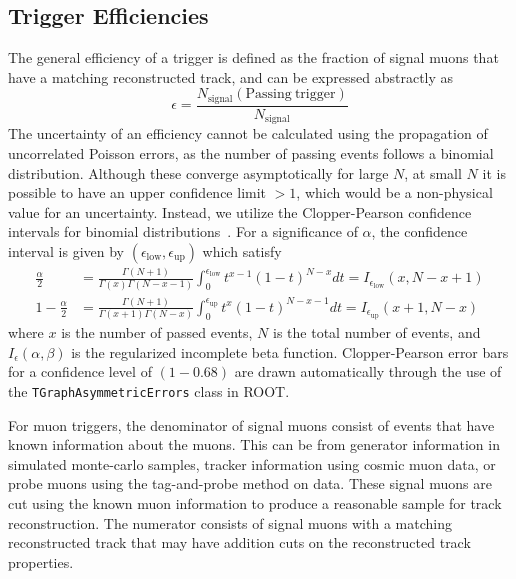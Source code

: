 \subsection{Trigger Efficiencies} \label{sec:kmtf_eff}
The general efficiency of a trigger is defined as the fraction of signal muons that have a matching reconstructed track, and can be expressed abstractly as
\begin{equation}\label{eq:eff}
	\epsilon=\frac{N_\mathrm{signal}(\mathrm{Passing\ trigger})}{N_\mathrm{signal}}	
\end{equation}
The uncertainty of an efficiency cannot be calculated using the propagation of uncorrelated Poisson errors, as the number of passing events follows a binomial distribution. Although these converge asymptotically for large $N$, at small $N$ it is possible to have an upper confidence limit $>1$, which would be a non-physical value for an uncertainty. Instead, we utilize the Clopper-Pearson confidence intervals for binomial distributions~\cite{clopperpearson}. For a significance of $\alpha$, the confidence interval is given by $(\epsilon_\text{low}, \epsilon_\text{up})$ which satisfy
\begin{align}
		\frac{\alpha}{2}&=\frac{\Gamma(N+1)}{\Gamma(x)\Gamma(N-x-1)}\int_{0}^{\epsilon_\text{low}}t^{x-1}(1-t)^{N-x}dt=I_{\epsilon_\text{low}}(x,N-x+1)\\
		1-\frac{\alpha}{2}&=\frac{\Gamma(N+1)}{\Gamma(x+1)\Gamma(N-x)}\int_{0}^{\epsilon_\text{up}}t^x(1-t)^{N-x-1}dt=I_{\epsilon_\text{up}}(x+1,N-x)
\end{align}
where $x$ is the number of passed events, $N$ is the total number of events, and $I_\epsilon(\alpha,\beta)$ is the regularized incomplete beta function. Clopper-Pearson error bars for a confidence level of $(1-0.68)$ are drawn automatically through the use of the \texttt{TGraphAsymmetricErrors} class in ROOT.

For muon triggers, the denominator of signal muons consist of events that have known information about the muons. This can be from generator information in simulated monte-carlo samples, tracker information using cosmic muon data, or probe muons using the tag-and-probe method on data. These signal muons are cut using the known muon information to produce a reasonable sample for track reconstruction. The numerator consists of signal muons with a matching reconstructed track that may have addition cuts on the reconstructed track properties.

